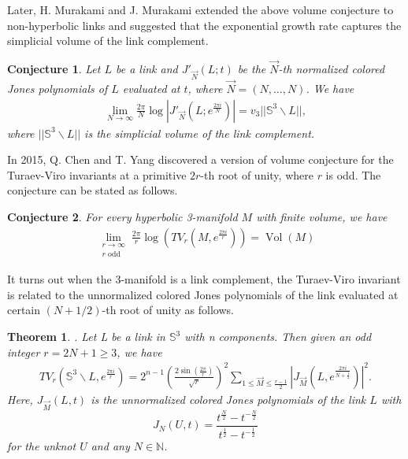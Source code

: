 \documentclass[10pt,a4paper]{article}
\newcommand{\lt}{\left}
\newcommand{\rt}{\right}
\def\Vol{\operatorname{Vol}}
\newtheorem{conjecture}{Conjecture}
\newtheorem{theorem}{Theorem}
\def\SS{{\mathbb S}}
\def\NN{{\mathbb N}}
\def\Vol{\operatorname{Vol}}
\begin{document}
Later, H. Murakami and J. Murakami extended the above volume conjecture to non-hyperbolic links and suggested that the exponential growth rate captures the simplicial volume of the link complement.

\begin{conjecture}\label{cvcMM}\cite{MM01} Let $L$ be a link and $J'_{\vec{N}}(L;t)$ be the $\vec{N}$-th normalized colored Jones polynomials of $L$ evaluated at $t$, where $\vec{N} = (N,\dots, N)$. We have
\begin{align*}
\lim_{N \to \infty} \frac{2\pi}{N} \log|J'_{\vec{N}}(L;e^{\frac{2\pi i}{N}})| = v_3||\SS^3 \backslash L||,
\end{align*}
where $||\SS^3 \backslash L||$ is the simplicial volume of the link complement.
\end{conjecture}

In 2015, Q. Chen and T. Yang discovered a version of volume conjecture for the Turaev-Viro invariants at a primitive $2r$-th root of unity, where $r$ is odd. The conjecture can be stated as follows.

\begin{conjecture}\label{vctv}\cite{CY15}
For every hyperbolic 3-manifold $M$ with finite volume, we have
\begin{align*}
\lim_{\substack{ r\to \infty \\r \text{ odd}}}\frac{2\pi}{r}\log \left(TV_{r}(M,e^{\frac{2\pi i}{r}})\right) = \Vol(M)
\end{align*}
\end{conjecture}

It turns out when the $3$-manifold is a link complement, the Turaev-Viro invariant is related to the unnormalized colored Jones polynomials of the link evaluated at certain $(N+1/2)$-th root of unity as follows.

\begin{theorem}\label{relationship} \cite{DKY17}.
Let L be a link in $\SS^3$ with n components. Then given an odd integer $r=2N+1 \geq 3$, we have
\begin{align*}
TV_{r}\left(\SS^3 \backslash L, e^{\frac{2\pi i}{r}}\right) = 2^{n-1}\lt( \frac{2\sin(\frac{2\pi}{r})}{\sqrt{r}}\rt)^{2} \sum_{1\leq \vec{M} \leq \frac{r-1}{2}}\left|{J}_{\vec{M}}\left(L,e^{\frac{2\pi i }{N+\frac{1}{2}}}\right)\right|^2 .
\end{align*}
Here, $J_{\vec{M}}(L,t)$ is the unnormalized colored Jones polynomials of the link $L$ with
$$J_N(U,t) = \frac{t^{\frac{N}{2}} - t^{-\frac{N}{2}}}{t^{\frac{1}{2}}-t^{-\frac{1}{2}}}$$
for the unknot $U$ and any $N \in \NN$.
\end{theorem}
\end{document}
